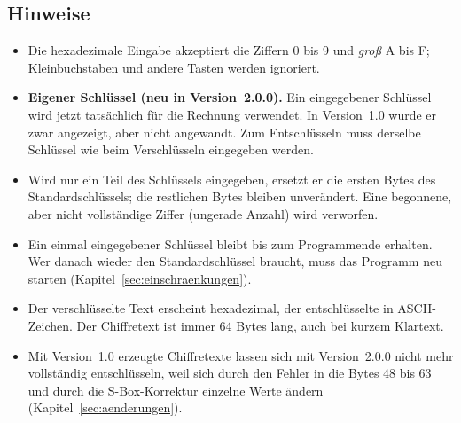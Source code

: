 \subsection{Hinweise}
\begin{itemize}[noitemsep]
    \item Die hexadezimale Eingabe akzeptiert die Ziffern 0 bis 9 und \emph{groß} A bis F; Kleinbuchstaben und andere Tasten werden ignoriert.
    \item \textbf{Eigener Schlüssel (neu in Version~2.0.0).} Ein eingegebener Schlüssel wird jetzt tatsächlich für die Rechnung verwendet. In Version~1.0 wurde er zwar angezeigt, aber nicht angewandt. Zum Entschlüsseln muss derselbe Schlüssel wie beim Verschlüsseln eingegeben werden.
    \item Wird nur ein Teil des Schlüssels eingegeben, ersetzt er die ersten Bytes des Standardschlüssels; die restlichen Bytes bleiben unverändert. Eine begonnene, aber nicht vollständige Ziffer (ungerade Anzahl) wird verworfen.
    \item Ein einmal eingegebener Schlüssel bleibt bis zum Programmende erhalten. Wer danach wieder den Standardschlüssel braucht, muss das Programm neu starten (Kapitel~\ref{sec:einschraenkungen}).
    \item Der verschlüsselte Text erscheint hexadezimal, der entschlüsselte in ASCII-Zeichen. Der Chiffretext ist immer 64 Bytes lang, auch bei kurzem Klartext.
    \item Mit Version~1.0 erzeugte Chiffretexte lassen sich mit Version~2.0.0 nicht mehr vollständig entschlüsseln, weil sich durch den Fehler in  die Bytes 48 bis 63 und durch die S-Box-Korrektur einzelne Werte ändern (Kapitel~\ref{sec:aenderungen}).
\end{itemize}

